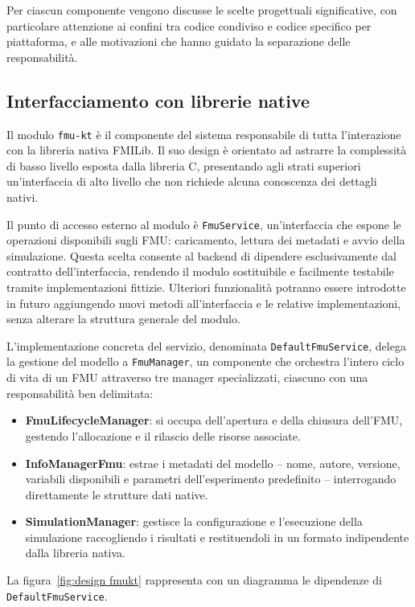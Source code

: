 Per ciascun componente vengono discusse le scelte progettuali significative, con particolare attenzione ai confini tra codice condiviso e codice specifico per piattaforma, e alle motivazioni che hanno guidato la separazione delle responsabilità.

\subsection{Interfacciamento con librerie native}
\label{subsec:design-native}

Il modulo \texttt{fmu-kt} è il componente del sistema responsabile di tutta l'interazione con la libreria nativa FMILib. Il suo design è orientato ad astrarre la complessità di basso livello esposta dalla libreria C, presentando agli strati superiori un'interfaccia di alto livello che non richiede alcuna conoscenza dei dettagli nativi.

Il punto di accesso esterno al modulo è \texttt{FmuService}, un'interfaccia che espone le operazioni disponibili sugli FMU: caricamento, lettura dei metadati e avvio della simulazione. Questa scelta consente al backend di dipendere esclusivamente dal contratto dell'interfaccia, rendendo il modulo sostituibile e facilmente testabile tramite implementazioni fittizie.
Ulteriori funzionalità potranno essere introdotte in futuro aggiungendo nuovi metodi all'interfaccia e le relative implementazioni, senza alterare la struttura generale del modulo.

L'implementazione concreta del servizio, denominata \texttt{DefaultFmuService}, delega la gestione del modello a \texttt{FmuManager}, un componente che orchestra l'intero ciclo di vita di un FMU attraverso tre manager specializzati, ciascuno con una responsabilità ben delimitata:

\begin{itemize}
  \item \textbf{FmuLifecycleManager}: si occupa dell'apertura e della chiusura dell'FMU, gestendo l'allocazione e il rilascio delle risorse associate.
  \item \textbf{InfoManagerFmu}: estrae i metadati del modello -- nome, autore, versione, variabili disponibili e parametri dell'esperimento predefinito -- interrogando direttamente le strutture dati native.
  \item \textbf{SimulationManager}: gestisce la configurazione e l'esecuzione della simulazione raccogliendo i risultati e restituendoli in un formato indipendente dalla libreria nativa.
\end{itemize}
La figura~\ref{fig:design fmukt} rappresenta con un diagramma le dipendenze di \texttt{DefaultFmuService}.

